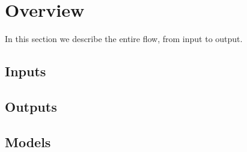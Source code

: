 \section{Overview}
\label{sec:overview}

In this section we describe the entire flow, from input to output.


\subsection{Inputs}
\subsection{Outputs}
\subsection{Models}

